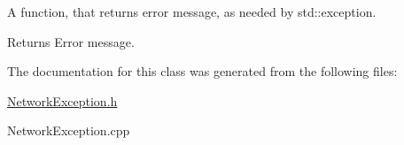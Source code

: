 A function, that returns error message, as needed by std\-::exception. 

\begin{DoxyReturn}{Returns}
Error message. 
\end{DoxyReturn}


The documentation for this class was generated from the following files\-:\begin{DoxyCompactItemize}
\item 
\hyperlink{_network_exception_8h}{Network\-Exception.\-h}\item 
Network\-Exception.\-cpp\end{DoxyCompactItemize}
